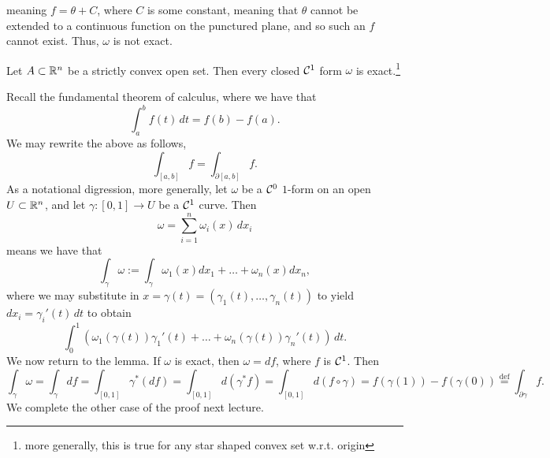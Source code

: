 meaning $f = \theta + C$, where $C$ is some constant, meaning that $\theta$ cannot be extended to a continuous function on the punctured plane, and so such an $f$ cannot exist. Thus, $\omega$ is not exact. 
\begin{simplethm}
    Let $A \subset \mathbb R^n$ be a strictly convex open set. Then every closed $\mathcal C^1$ form $\omega$ is exact.\footnote{more generally, this is true for any star shaped convex set w.r.t. origin}
\end{simplethm}
\noindent Recall the fundamental theorem of calculus, where we have that
\[ \int_a^b f(t) \, dt = f(b) - f(a). \]
We may rewrite the above as follows,
\[ \int_{[a, b]} f = \int_{\partial [a, b]} f. \]
As a notational digression, more generally, let $\omega$ be a $\mathcal C^0$ $1$-form on an open $U \subset \mathbb R^n$, and let $\gamma : [0, 1] \to U$ be a $\mathcal C^1$ curve. Then
\[ \omega = \sum_{i=1}^n \omega_i(x) \, dx_i \]
means we have that
\[ \int_\gamma \omega := \int_\gamma \omega_1(x) dx_1 + \dots + \omega_n(x) dx_n, \]
where we may substitute in $x = \gamma(t) = (\gamma_1(t), \dots, \gamma_n(t))$ to yield $dx_i = \gamma_i'(t) \, dt$ to obtain
\[ \int_0^1 \left(\omega_1(\gamma(t)) \gamma_1'(t) + \dots + \omega_n(\gamma(t)) \gamma_n'(t)\right) \, dt. \]
We now return to the lemma. If $\omega$ is exact, then $\omega = df$, where $f$ is $\mathcal C^1$. Then
\[ \int_\gamma \omega = \int_\gamma df = \int_{[0, 1]} \gamma^\ast(df) = \int_{[0, 1]} d(\gamma^\ast f) = \int_{[0, 1]} d(f \circ \gamma) = f(\gamma(1)) - f(\gamma(0)) \stackrel{\text{def}}{=} \int_{\partial \gamma} f. \]
We complete the other case of the proof next lecture.